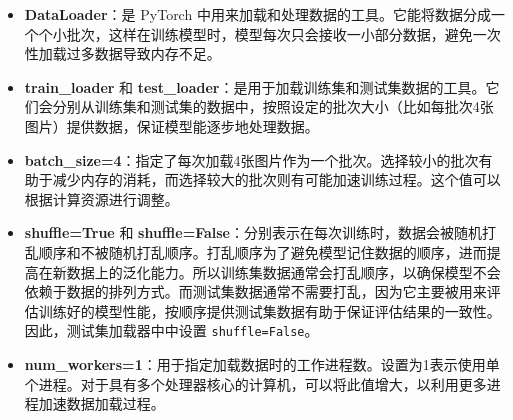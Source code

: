\begin{itemize}
    \item \textbf{DataLoader}：是 PyTorch 中用来加载和处理数据的工具。它能将数据分成一个个小批次，这样在训练模型时，模型每次只会接收一小部分数据，避免一次性加载过多数据导致内存不足。
    \item \textbf{train\_loader} 和 \textbf{test\_loader}：是用于加载训练集和测试集数据的工具。它们会分别从训练集和测试集的数据中，按照设定的批次大小（比如每批次4张图片）提供数据，保证模型能逐步地处理数据。
    \item \textbf{batch\_size=4}：指定了每次加载4张图片作为一个批次。选择较小的批次有助于减少内存的消耗，而选择较大的批次则有可能加速训练过程。这个值可以根据计算资源进行调整。
    \item \textbf{shuffle=True} 和 \textbf{shuffle=False}：分别表示在每次训练时，数据会被随机打乱顺序和不被随机打乱顺序。打乱顺序为了避免模型记住数据的顺序，进而提高在新数据上的泛化能力。所以训练集数据通常会打乱顺序，以确保模型不会依赖于数据的排列方式。而测试集数据通常不需要打乱，因为它主要被用来评估训练好的模型性能，按顺序提供测试集数据有助于保证评估结果的一致性。因此，测试集加载器中中设置 \texttt{shuffle=False}。
    \item \textbf{num\_workers=1}：用于指定加载数据时的工作进程数。设置为1表示使用单个进程。对于具有多个处理器核心的计算机，可以将此值增大，以利用更多进程加速数据加载过程。
    
\end{itemize}
